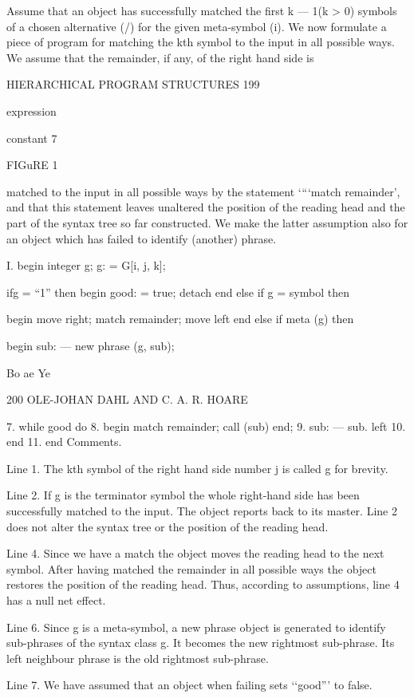 {{{{	Assume that an object has successfully matched the first k — 1(k > 0) symbols of a chosen alternative (/) for the given meta-symbol (i). We now formulate a piece of program for matching the kth symbol to the input in all possible ways. We assume that the remainder, if any, of the right hand side is
	
	HIERARCHICAL PROGRAM STRUCTURES 199
	
	
	expression
	
	constant 7
	
	FIGuRE 1
	
	matched to the input in all possible ways by the statement ‘“‘match remainder’, and that this statement leaves unaltered the position of the reading head and the part of the syntax tree so far constructed. We make the latter assumption also for an object which has failed to identify (another) phrase.
	
	I. begin integer g; g: = G[i, j, k];
	
	ifg = “1” then begin good: = true; detach end else if g = symbol then
	
	begin move right; match remainder; move left end else if meta (g) then
	
	begin sub: — new phrase (g, sub);
	
	Bo ae Ye
	
	200 OLE-JOHAN DAHL AND C. A. R. HOARE
	
	7. while good do 8. begin match remainder; call (sub) end; 9. sub: — sub. left 10. end 11. end Comments.
	
	Line 1. The kth symbol of the right hand side number j is called g for brevity.
	
	Line 2. If g is the terminator symbol the whole right-hand side has been successfully matched to the input. The object reports back to its master. Line 2 does not alter the syntax tree or the position of the reading head.
	
	Line 4. Since we have a match the object moves the reading head to the next symbol. After having matched the remainder in all possible ways the object restores the position of the reading head. Thus, according to assumptions, line 4 has a null net effect.
	
	Line 6. Since g is a meta-symbol, a new phrase object is generated to identify sub-phrases of the syntax class g. It becomes the new rightmost sub-phrase. Its left neighbour phrase is the old rightmost sub-phrase.
	
	Line 7. We have assumed that an object when failing sets ‘‘good”’ to false.
	
}}}}
